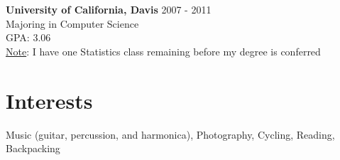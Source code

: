 \documentclass[margin]{res}
\begin{document}
\begin{resume}
{\bf University of California, Davis}  \hfill 2007 - 2011\\
Majoring in Computer Science \\
GPA: 3.06\\
\underline{Note}: I have one Statistics class remaining before my degree is conferred

\section{Interests}
Music (guitar, percussion, and harmonica), Photography, Cycling, Reading, Backpacking

\end{resume} 
\end{document}
